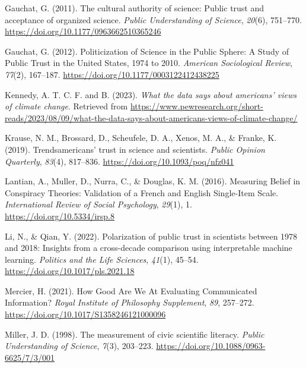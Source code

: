 \documentclass[
  doc,floatsintext]{apa6}
\newlength{\cslhangindent}
\newenvironment{CSLReferences}[2] %
 {\begin{list}{}{%
  \setlength{\itemindent}{0pt}
  \setlength{\leftmargin}{0pt}
  \setlength{\parsep}{0pt}
  \ifodd #1
   \setlength{\leftmargin}{\cslhangindent}
   \setlength{\itemindent}{-1\cslhangindent}
  \fi
  \setlength{\itemsep}{#2\baselineskip}}}
 {\end{list}}
\begin{document}
\begin{CSLReferences}{1}{0}
Gauchat, G. (2011). The cultural authority of science: Public trust and acceptance of organized science. \emph{Public Understanding of Science}, \emph{20}(6), 751--770. \url{https://doi.org/10.1177/0963662510365246}

Gauchat, G. (2012). Politicization of Science in the Public Sphere: A Study of Public Trust in the United States, 1974 to 2010. \emph{American Sociological Review}, \emph{77}(2), 167--187. \url{https://doi.org/10.1177/0003122412438225}

Kennedy, A. T. C. F. and B. (2023). \emph{What the data says about americans{'} views of climate change}. Retrieved from \url{https://www.pewresearch.org/short-reads/2023/08/09/what-the-data-says-about-americans-views-of-climate-change/}

Krause, N. M., Brossard, D., Scheufele, D. A., Xenos, M. A., \& Franke, K. (2019). Trends{\textemdash}americans{'} trust in science and scientists. \emph{Public Opinion Quarterly}, \emph{83}(4), 817--836. \url{https://doi.org/10.1093/poq/nfz041}

Lantian, A., Muller, D., Nurra, C., \& Douglas, K. M. (2016). Measuring Belief in Conspiracy Theories: Validation of a French and English Single-Item Scale. \emph{International Review of Social Psychology}, \emph{29}(1), 1. \url{https://doi.org/10.5334/irsp.8}

Li, N., \& Qian, Y. (2022). Polarization of public trust in scientists between 1978 and 2018: Insights from a cross-decade comparison using interpretable machine learning. \emph{Politics and the Life Sciences}, \emph{41}(1), 45--54. \url{https://doi.org/10.1017/pls.2021.18}

Mercier, H. (2021). How Good Are We At Evaluating Communicated Information? \emph{Royal Institute of Philosophy Supplement}, \emph{89}, 257--272. \url{https://doi.org/10.1017/S1358246121000096}

Miller, J. D. (1998). The measurement of civic scientific literacy. \emph{Public Understanding of Science}, \emph{7}(3), 203--223. \url{https://doi.org/10.1088/0963-6625/7/3/001}


\end{CSLReferences}
\end{document}

